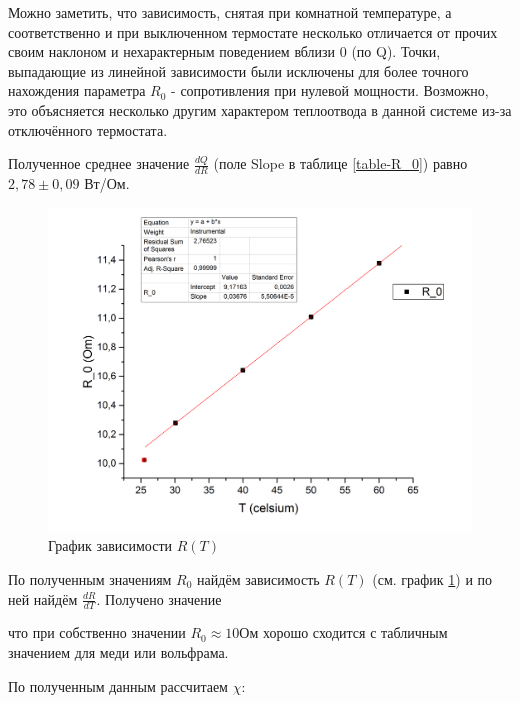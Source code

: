 \documentclass[a4paper,12pt]{article}
\begin{document}
Можно заметить, что зависимость, снятая при комнатной температуре, а соответственно и при выключенном термостате несколько отличается от прочих своим наклоном и нехарактерным поведением вблизи 0 (по Q). Точки, выпадающие из линейной зависимости были исключены для более точного нахождения параметра $R_0$ - сопротивления при нулевой мощности.
Возможно, это объясняется несколько другим характером теплоотвода в данной системе из-за отключённого термостата.

Полученное среднее значение $\frac{dQ}{dR}$ (поле Slope в таблице \ref{table-R_0}) равно $2,78 \pm 0,09 $ Вт/Ом.

\begin{figure}[ht]
\centering
\includegraphics[width=160mm]{graph2.jpg}
\caption{График зависимости $R(T)$}
\label{graph-R0}
\end{figure} 

По полученным значениям $R_0$ найдём зависимость $R(T)$ (см. график \ref{graph-R0})  и по ней найдём $\frac{dR}{dT}$. Получено значение \underline{                 }

 что при собственно значении $R_0 \approx 10 $Ом хорошо сходится с табличным значением для меди или вольфрама.
 
По полученным данным рассчитаем $\chi$:
\bigskip

 
\end{document}
